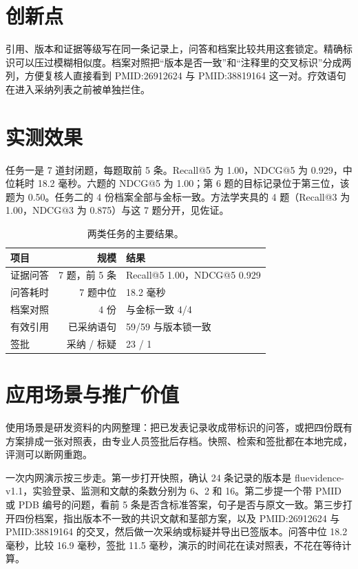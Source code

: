 \section{创新点}
引用、版本和证据等级写在同一条记录上，问答和档案比较共用这套锁定。精确标识可以压过模糊相似度。档案对照把“版本是否一致”和“注释里的交叉标识”分成两列，方便复核人直接看到 PMID:26912624 与 PMID:38819164 这一对。疗效语句在进入采纳列表之前被单独拦住。

\section{实测效果}
任务一是 7 道封闭题，每题取前 5 条。Recall@5 为 1.00，NDCG@5 为 0.929，中位耗时 18.2 毫秒。六题的 NDCG@5 为 1.00；第 6 题的目标记录位于第三位，该题为 0.50。任务二的 4 份档案全部与金标一致。方法学夹具的 4 题（Recall@3 为 1.00，NDCG@3 为 0.875）与这 7 题分开，见佐证。

\begin{table}[ht]
\centering
\caption{两类任务的主要结果。}
\label{tab:head}
\begin{tabular}{lrl}
\toprule
项目 & 规模 & 结果 \\
\midrule
证据问答 & 7 题，前 5 条 & Recall@5 1.00，NDCG@5 0.929 \\
问答耗时 & 7 题中位 & 18.2 毫秒 \\
档案对照 & 4 份 & 与金标一致 4/4 \\
有效引用 & 已采纳语句 & 59/59 与版本锁一致 \\
签批 & 采纳 / 标疑 & 23 / 1 \\
\bottomrule
\end{tabular}
\end{table}

\section{应用场景与推广价值}
使用场景是研发资料的内网整理：把已发表记录收成带标识的问答，或把四份既有方案排成一张对照表，由专业人员签批后存档。快照、检索和签批都在本地完成，评测可以断网重跑。

一次内网演示按三步走。第一步打开快照，确认 24 条记录的版本是 fluevidence-v1.1，实验登录、监测和文献的条数分别为 6、2 和 16。第二步提一个带 PMID 或 PDB 编号的问题，看前 5 条是否含标准答案，句子是否与原文一致。第三步打开四份档案，指出版本不一致的共识文献和茎部方案，以及 PMID:26912624 与 PMID:38819164 的交叉，然后做一次采纳或标疑并导出已签版本。问答中位 18.2 毫秒，比较 16.9 毫秒，签批 11.5 毫秒，演示的时间花在读对照表，不花在等待计算。

